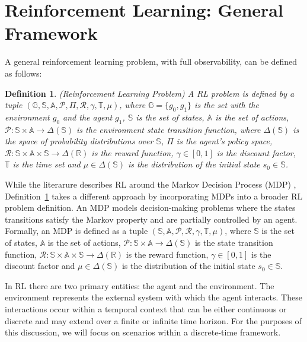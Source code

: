 \documentclass[12pt]{article}
\newtheorem{definition}[theorem]{Definition}
\begin{document}
\section{Reinforcement Learning: General Framework}

A general reinforcement learning problem, with full observability, can be defined as follows:

\begin{definition}\label{def:rl_problem} (Reinforcement Learning Problem) A RL problem is defined by a tuple $\left(\mathbb{G},\mathbb{S},\mathbb{A},\mathcal{P},\Pi,\mathcal{R},\gamma,\mathbb{T},\mu \right)$, where $\mathbb{G} = \{g_{0},g_{1}\}$ is the set with the environment $g_{0}$ and the agent $g_{1}$, $\mathbb{S}$ is the set of states, $\mathbb{A}$ is the set of actions, $\mathcal{P}: \mathbb{S} \times \mathbb{A} \to \Delta(\mathbb{S})$ is the environment state transition function, where $\Delta (\mathbb{S})$ is the space of probability distributions over $\mathbb{S}$, $\Pi$ is the agent's policy space, $\mathcal{R}: \mathbb{S} \times \mathbb{A} \times \mathbb{S} \to \Delta (\mathbb{R})$ is the reward function, $\gamma \in [0,1]$ is the discount factor, $\mathbb{T}$ is the time set and $\mu \in \Delta (\mathbb{S})$ is the distribution of the initial state $s_{0} \in \mathbb{S}$.
\end{definition}

While the literarure describes RL around the Markov Decision Process (MDP) \cite{sutton2018reinforcement}, Definition~\ref{def:rl_problem}  takes a different approach by incorporating MDPs into a broader RL problem definition. An MDP models decision-making problems where the states transitions satisfy the Markov property and are partially controlled by an agent. Formally, an MDP is defined as a tuple $\left(\mathbb{S},\mathbb{A},\mathcal{P},\mathcal{R},\gamma,\mathbb{T},\mu \right)$, where $\mathbb{S}$ is the set of states, $\mathbb{A}$ is the set of actions, $\mathcal{P}: \mathbb{S} \times \mathbb{A} \to \Delta(\mathbb{S})$ is the state transition function, $\mathcal{R}: \mathbb{S} \times \mathbb{A} \times \mathbb{S} \to \Delta (\mathbb{R})$ is the reward function, $\gamma \in [0,1]$ is the discount factor and $\mu \in \Delta (\mathbb{S})$ is the distribution of the initial state $s_{0} \in \mathbb{S}$.

In RL there are two primary entities: the agent and the environment. The environment represents the external system with which the agent interacts. These interactions occur within a temporal context that can be either continuous or discrete and may extend over a finite or infinite time horizon. For the purposes of this discussion, we will focus on scenarios within a discrete-time framework.
\end{document}
